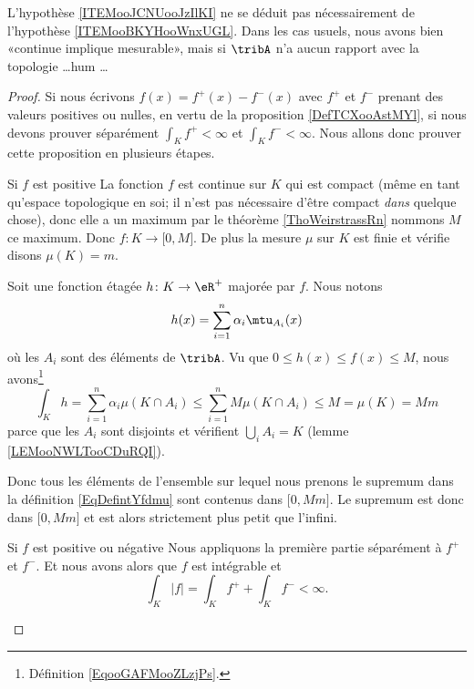 L'hypothèse \ref{ITEMooJCNUooJzIlKI} ne se déduit pas nécessairement de l'hypothèse \ref{ITEMooBKYHooWnxUGL}. Dans les cas usuels, nous avons bien «continue implique mesurable», mais si \( \tribA\) n'a aucun rapport avec la topologie \ldots hum \ldots

\begin{proof}
    Si nous écrivons \( f(x)=f^+(x)-f^-(x)\) avec \( f^+\) et \( f^-\) prenant des valeurs positives ou nulles\cite{ooFSBCooVpuWaV}, en vertu de la proposition \ref{DefTCXooAstMYl}, si nous devons prouver séparément \( \int_Kf^+<\infty\) et \( \int_Kf^-<\infty\). Nous allons donc prouver cette proposition en plusieurs étapes.
    \begin{subproof}
        \item[Si \( f\) est positive]
            La fonction \( f\) est continue sur \( K\) qui est compact (même en tant qu'espace topologique en soi; il n'est pas nécessaire d'être compact \emph{dans} quelque chose), donc elle a un maximum par le théorème \ref{ThoWeirstrassRn} nommons \( M\) ce maximum. Donc \( f\colon K\to \mathopen[ 0 , M \mathclose]\). De plus la mesure \( \mu\) sur \( K\) est finie et vérifie disons \( \mu(K)=m\). 

            Soit une fonction étagée \( h\colon K\to \eR^+\) majorée par \( f\). Nous notons
            \begin{equation}
                h(x)=\sum_{i=1}^n\alpha_i\mtu_{A_i}(x)
            \end{equation}
            où les \( A_i\) sont des éléments de \( \tribA\). Vu que \( 0\leq h(x)\leq f(x)\leq M\), nous avons\footnote{Définition \eqref{EqooGAFMooZLzjPs}.}
            \begin{equation}
                \int_Kh=\sum_{i=1}^n\alpha_i\mu(K\cap A_i)\leq \sum_{i=1}^nM\mu(K\cap A_i)\leq M= \mu(K)=Mm
            \end{equation}
            parce que les \( A_i\) sont disjoints et vérifient \( \bigcup_iA_i=K\) (lemme \ref{LEMooNWLTooCDuRQI}).

            Donc tous les éléments de l'ensemble sur lequel nous prenons le supremum dans la définition \eqref{EqDefintYfdmu} sont contenus dans \( \mathopen[ 0 , Mm \mathclose]\). Le supremum est donc dans \( \mathopen[ 0 , Mm \mathclose]\) et est alors strictement plus petit que l'infini.

        \item[Si \( f\) est positive ou négative]
            Nous appliquons la première partie séparément à \( f^+\) et \( f^-\). Et nous avons alors que \( f\) est intégrable et
            \begin{equation}
                \int_K| f |=\int_Kf^++\int_Kf^-<\infty.
            \end{equation}
    \end{subproof}
\end{proof}


